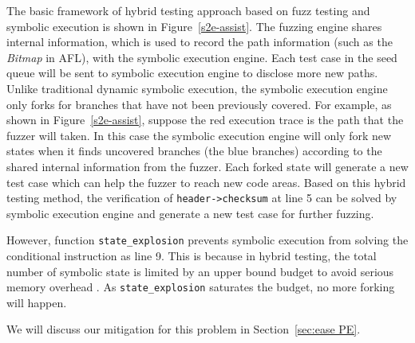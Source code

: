 The basic framework of hybrid testing approach based on fuzz testing and symbolic execution is shown in Figure~\ref{s2e-assist}.
 The fuzzing engine shares internal information, which is used to record the path information (such as the \textit{Bitmap} in AFL), with the symbolic execution engine. 
 Each test case in the seed queue will be sent to symbolic execution engine to disclose more new paths. 
 Unlike traditional dynamic symbolic execution, the symbolic execution engine only forks for branches that have not been previously covered.
 For example, as shown in Figure~\ref{s2e-assist}, suppose the red execution trace is the path that the fuzzer will taken. In this case the symbolic execution engine will only fork new states when it finds uncovered branches (the blue branches) according to the shared internal information from the fuzzer.
 Each forked state will generate a new test case which can help the fuzzer to reach new code areas. 
 Based on this hybrid testing method, the verification of \texttt{header->checksum} at line 5 can be solved by symbolic execution engine and generate a new test case for further fuzzing.

However, function \texttt{state\_explosion} prevents symbolic execution from solving the conditional instruction as line 9.
 This is because in hybrid testing, the total number of symbolic state is limited by an upper bound budget to avoid serious memory overhead \cite{stephens2016driller}. 
 As \texttt{state\_explosion} saturates the budget, no more forking will happen.

We will discuss our mitigation for this problem in Section~\ref{sec:ease PE}.
